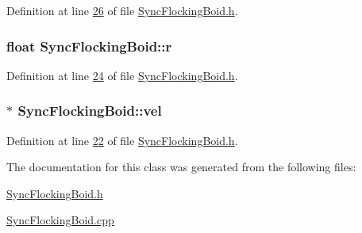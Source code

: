 Definition at line \hyperlink{_sync_flocking_boid_8h_source_l00026}{26} of file \hyperlink{_sync_flocking_boid_8h_source}{Sync\+Flocking\+Boid.\+h}.

\hypertarget{class_sync_flocking_boid_ac4386412e74ca67214ad6e1c55eb1525}{}
\subsubsection[{r}]{\setlength{\rightskip}{0pt plus 5cm}float Sync\+Flocking\+Boid\+::r}\label{class_sync_flocking_boid_ac4386412e74ca67214ad6e1c55eb1525}


Definition at line \hyperlink{_sync_flocking_boid_8h_source_l00024}{24} of file \hyperlink{_sync_flocking_boid_8h_source}{Sync\+Flocking\+Boid.\+h}.

\hypertarget{class_sync_flocking_boid_a1b6cf043598e64ecd40ecd5b75beb01f}{}
\subsubsection[{vel}]{$\ast$ Sync\+Flocking\+Boid\+::vel}\label{class_sync_flocking_boid_a1b6cf043598e64ecd40ecd5b75beb01f}


Definition at line \hyperlink{_sync_flocking_boid_8h_source_l00022}{22} of file \hyperlink{_sync_flocking_boid_8h_source}{Sync\+Flocking\+Boid.\+h}.



The documentation for this class was generated from the following files\+:\begin{DoxyCompactItemize}
\item 
\hyperlink{_sync_flocking_boid_8h}{Sync\+Flocking\+Boid.\+h}\item 
\hyperlink{_sync_flocking_boid_8cpp}{Sync\+Flocking\+Boid.\+cpp}\end{DoxyCompactItemize}
